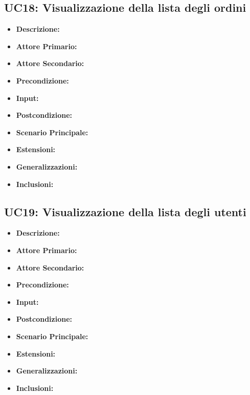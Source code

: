         \subsection{UC18: Visualizzazione della lista degli ordini}
        \begin{itemize}
            \item \textbf{Descrizione:}
            \item \textbf{Attore Primario:}
            \item \textbf{Attore Secondario:}
            \item \textbf{Precondizione:}
            \item \textbf{Input:}
            \item \textbf{Postcondizione:}
            \item \textbf{Scenario Principale:}
            \item \textbf{Estensioni:}
            \item \textbf{Generalizzazioni:}
            \item \textbf{Inclusioni:}
        \end{itemize}
        \subsection{UC19: Visualizzazione della lista degli utenti}
            \begin{itemize}
                \item \textbf{Descrizione:}
                \item \textbf{Attore Primario:}
                \item \textbf{Attore Secondario:}
                \item \textbf{Precondizione:}
                \item \textbf{Input:}
                \item \textbf{Postcondizione:}
                \item \textbf{Scenario Principale:}
                \item \textbf{Estensioni:}
                \item \textbf{Generalizzazioni:}
                \item \textbf{Inclusioni:}
            \end{itemize}

